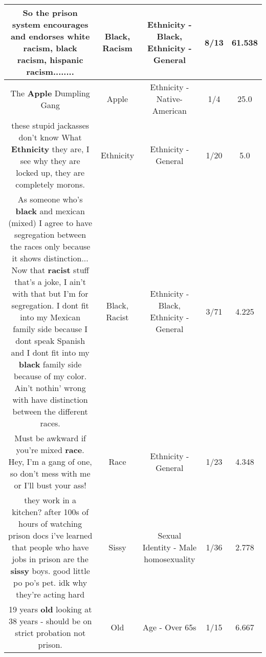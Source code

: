 \documentclass[11pt]{article}
\newlength\mylength
\begin{document}
\begin{center}
\begin{longtable}{|C{.65\mylength}|C{.30\mylength}|C{.12\mylength}|C{.12\mylength}|C{.12\mylength}|}
  \small So the prison system encourages and endorses white \textbf{racism}, \textbf{black} \textbf{racism}, hispanic \textbf{racism}........\normalsize   & Black, Racism & Ethnicity - Black, Ethnicity - General & 8/13 & 61.538 \\  \hline
  \small The \textbf{Apple} Dumpling Gang\normalsize   & Apple & Ethnicity - Native-American & 1/4 & 25.0 \\  \hline
  \small these stupid jackasses don't know What \textbf{Ethnicity} they are, I see why they are locked up, they are completely morons.\normalsize   & Ethnicity & Ethnicity - General & 1/20 & 5.0 \\  \hline
  \small As someone who's \textbf{black} and mexican (mixed) I agree to have segregation between the races only because it shows distinction... Now that \textbf{racist} stuff that's a joke, I ain't with that but I'm for segregation. I dont fit into my Mexican family side because I dont speak Spanish and I dont fit into my \textbf{black} family side because of my color. Ain't nothin' wrong with have distinction between the different races.\normalsize   & Black, Racist & Ethnicity - Black, Ethnicity - General & 3/71 & 4.225 \\  \hline
  \small Must be awkward if you're mixed \textbf{race}. Hey, I'm a gang of one, so don't mess with me or I'll bust your ass!\normalsize   & Race & Ethnicity - General & 1/23 & 4.348 \\  \hline
  \small they work in a kitchen? after 100s of hours of watching prison docs i've learned that people who have jobs in prison are the \textbf{sissy} boys. good little po po's pet. idk why they're acting hard\normalsize   & Sissy & Sexual Identity - Male homosexuality & 1/36 & 2.778 \\  \hline
  \small 19 years \textbf{old} looking at 38 years -  should be on strict probation not prison.\normalsize   & Old & Age - Over 65s & 1/15 & 6.667 \\  \hline

\end{longtable}
\end{center}
\end{document}
